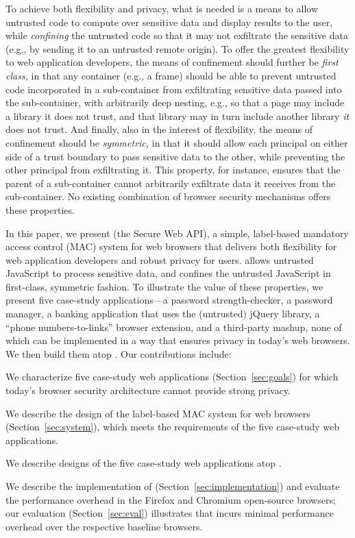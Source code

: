To achieve both flexibility and privacy, what is needed is a means to
allow untrusted code to compute over sensitive data and display
results to the user, while \emph{confining} the untrusted code so that
it may not exfiltrate the sensitive data (e.g., by sending it to an untrusted remote
origin).
%
To offer the greatest flexibility to web application developers, the
means of confinement should further be \emph{first class,} in that any
container (e.g., a frame) should be able to prevent untrusted code
incorporated in a sub-container from exfiltrating sensitive data passed
into the sub-container, with arbitrarily deep nesting, e.g., so that a
page may include a library it does not trust, and that library may in
turn include another library \emph{it} does not trust.
%
And finally, also in the interest of flexibility, the means of
confinement should be \emph{symmetric,} in that it should allow each
principal on either side of a trust boundary to pass sensitive data to
the other, while preventing the other principal from exfiltrating it.  
%
This property, for instance, ensures that the parent of a
sub-container cannot arbitrarily exfiltrate data it receives from the
sub-container.
%
No existing combination of browser security mechanisms offers these
properties.

In this paper, we present \sys{} (the Secure Web API), a simple,
label-based mandatory access control (MAC) system for web browsers
that delivers both flexibility for web application developers and
robust privacy for users. \sys{} allows untrusted JavaScript to
process sensitive data, and confines the untrusted JavaScript in
first-class, symmetric fashion.  To illustrate the value of these
properties, we present five case-study applications---a password
strength-checker, a password manager, a banking application that uses
the (untrusted) jQuery library, a ``phone numbers-to-links'' browser
extension, and a third-party mashup, none of which can be implemented
in a way that ensures privacy in today's web browsers.  We then build
them atop \sys. Our contributions include:

\begin{CompactItemize}
\item We characterize five case-study web applications
  (Section~\ref{sec:goals}) for which today's browser security
  architecture cannot provide strong privacy.
\item We describe the design of the \sys{} label-based MAC system
  for web browsers (Section~\ref{sec:system}), which meets the
  requirements of the five case-study web applications.
\item We describe designs of the five case-study web applications atop
  \sys.
\item We describe the implementation of \sys{}
  (Section~\ref{sec:implementation}) and evaluate the performance
  overhead in the Firefox and Chromium open-source browsers; our
  evaluation (Section~\ref{sec:eval}) illustrates that \sys{} incurs
  minimal performance overhead over the respective baseline browsers.
\end{CompactItemize}

